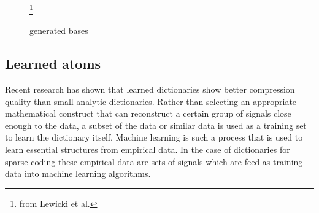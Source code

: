 \begin{figure}
\centering
{}
\hspace{5mm}
\hspace{5mm}
\caption{generated bases}\footnote{from Lewicki et al.} 

\label{fig:generated_atoms}
\end{figure}

\subsection{Learned atoms}
Recent research\cite{Chen1998,Aharon2006,Mairal2010} has shown that learned
dictionaries show better compression quality than small analytic
dictionaries. Rather than selecting an appropriate mathematical construct that
can reconstruct a certain group of signals close enough to the data, a subset of
the data or similar data is used as a training set to learn the dictionary
itself.
Machine learning is such a process that is used to learn essential structures
from empirical data. In the case of dictionaries for sparse coding these
empirical data are sets of signals which are feed as training data into machine
learning algorithms.

